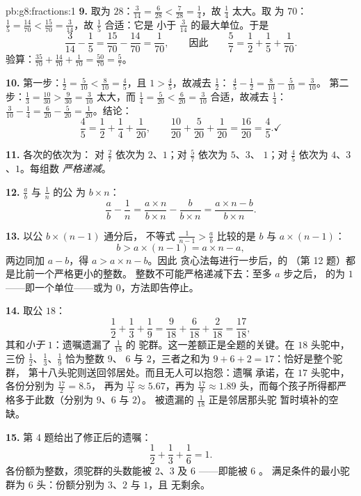 \begin{solution}{pb:g8:fractions:1}
\textbf{9.} 取为 $28$：$\frac{3}{14} = \frac{6}{28} <
\frac{7}{28} = \frac14$，故 $\frac14$ 太大。取
为 $70$：$\frac15 = \frac{14}{70} < \frac{15}{70} =
\frac{3}{14}$，故 $\frac15$ 合适：它是
小于 $\frac{3}{14}$ 的最大单位。于是
\[
\frac{3}{14} - \frac15 = \frac{15}{70} - \frac{14}{70}
= \frac{1}{70},
\qquad\text{因此}\qquad
\frac57 = \frac12 + \frac15 + \frac{1}{70} .
\]
验算：$\frac{35}{70} + \frac{14}{70} + \frac{1}{70} =
\frac{50}{70} = \frac57$。

\textbf{10.} 第一步：$\frac12 = \frac{5}{10} < \frac{8}{10} =
\frac45$，且 $1 > \frac45$，故减去 $\frac12$：
$\frac45 - \frac12 = \frac{8}{10} - \frac{5}{10} = \frac{3}{10}$。
第二步：$\frac13 = \frac{10}{30} > \frac{9}{30} =
\frac{3}{10}$ 太大，而 $\frac14 = \frac{5}{20} <
\frac{6}{20} = \frac{3}{10}$ 合适，故减去 $\frac14$：
$\frac{3}{10} - \frac14 = \frac{6}{20} - \frac{5}{20} =
\frac{1}{20}$。结论：
\[
\frac45 = \frac12 + \frac14 + \frac{1}{20},
\qquad
\frac{10}{20} + \frac{5}{20} + \frac{1}{20} = \frac{16}{20}
= \frac45 . \checkmark
\]

\textbf{11.} 各次的依次为：
对 $\frac27$ 依次为 $2$、$1$；对 $\frac57$ 依次为 $5$、$3$、
$1$；对 $\frac45$ 依次为 $4$、$3$、$1$。每组数
\emph{严格递减}。

\textbf{12.} $\frac ab$ 与 $\frac1n$ 的公
为 $b \times n$：
\[
\frac{a}{b} - \frac{1}{n}
= \frac{a \times n}{b \times n} - \frac{b}{b \times n}
= \frac{a \times n - b}{b \times n} .
\]

\textbf{13.} 以公 $b \times (n-1)$ 通分后，
不等式 $\frac{1}{n-1} > \frac ab$ 比较的是
 $b$ 与 $a \times (n - 1)$：
\[
b > a \times (n - 1) = a \times n - a ,
\]
两边同加 $a - b$，得 $a > a \times n - b$。因此
贪心法每进行一步后，的
（第 12 题）都是比前一个严格更小的整数。
整数不可能严格递减下去：至多 $a$ 步之后，
的为 $1$——即一个单位——或为
$0$，方法即告停止。

\textbf{14.} 取公 $18$：
\[
\frac12 + \frac13 + \frac19
= \frac{9}{18} + \frac{6}{18} + \frac{2}{18}
= \frac{17}{18} ,
\]
其和\emph{小于} $1$：遗嘱遗漏了 $\frac{1}{18}$ 的
驼群。这一差额正是全题的关键。在 $18$ 头驼中，
三份 $\frac12$、$\frac13$、$\frac19$ 恰为整数 $9$、
$6$ 与 $2$，三者之和为 $9 + 6 + 2 = 17$：恰好是整个驼群，
第十八头驼则送回邻居处。而且无人可以抱怨：遗嘱
承诺，在 $17$ 头驼中，各份分别为 $\frac{17}{2} = 8.5$，
再为 $\frac{17}{3} \approx 5.67$，再为 $\frac{17}{9} \approx 1.89$
头，而每个孩子所得都严格多于此数（分别为 $9$、$6$ 与 $2$）。
被遗漏的 $\frac{1}{18}$ 正是邻居那头驼
暂时填补的空缺。

\textbf{15.} 第 4 题给出了修正后的遗嘱：
\[
\frac12 + \frac13 + \frac16 = 1 .
\]
各份额为整数，须驼群的头数能被
$2$、$3$ 及 $6$ ——即能被 $6$ 。
满足条件的最小驼群为 $6$ 头：份额分别为 $3$、$2$ 与 $1$，且
无剩余。
\end{solution}
